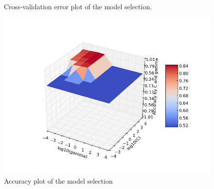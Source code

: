 \documentclass[aps,letterpaper,10pt]{revtex4}
\begin{document}
\begin{figure}[]
  \caption{Cross-validation error plot of the model selection.}\label{fig:5}
\endminipage\hfill
{}%
  \includegraphics[width=\linewidth]{img/acc_graph.png}
  \caption{Accuracy plot of the model selection}\label{fig:6}
\endminipage
\end{figure}
\end{document}
